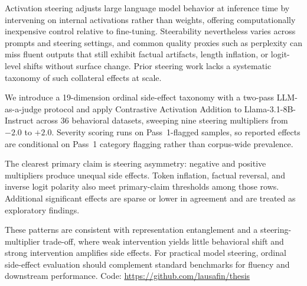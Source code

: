 Activation steering adjusts large language model behavior at inference time by intervening on internal activations rather than weights, offering computationally inexpensive control relative to fine-tuning.
Steerability nevertheless varies across prompts and steering settings, and common quality proxies such as perplexity can miss fluent outputs that still exhibit factual artifacts, length inflation, or logit-level shifts without surface change.
Prior steering work lacks a systematic taxonomy of such collateral effects at scale.

We introduce a 19-dimension ordinal side-effect taxonomy with a two-pass LLM-as-a-judge protocol and apply Contrastive Activation Addition to Llama-3.1-8B-Instruct across 36 behavioral datasets, sweeping nine steering multipliers from $-2.0$ to $+2.0$.
Severity scoring runs on Pass~1-flagged samples, so reported effects are conditional on Pass~1 category flagging rather than corpus-wide prevalence.

The clearest primary claim is steering asymmetry: negative and positive multipliers produce unequal side effects. Token inflation, factual reversal, and inverse logit polarity also meet primary-claim thresholds among those rows. Additional significant effects are sparse or lower in agreement and are treated as exploratory findings.

These patterns are consistent with representation entanglement and a steering-multiplier trade-off, where weak intervention yields little behavioral shift and strong intervention amplifies side effects.
For practical model steering, ordinal side-effect evaluation should complement standard benchmarks for fluency and downstream performance.
Code: \url{https://github.com/lausafin/thesis}
